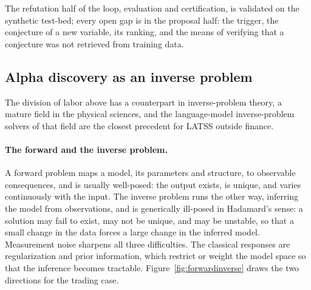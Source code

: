 \documentclass[11pt]{article}
\begin{document}
The refutation half of the loop, evaluation and certification, is validated on the synthetic test-bed;
every open gap is in the proposal half: the trigger, the conjecture of a new variable, its ranking, and
the means of verifying that a conjecture was not retrieved from training data.

\subsection{Alpha discovery as an inverse problem}
\label{sec:inverse}

The division of labor above has a counterpart in inverse-problem theory, a mature field in the physical
sciences, and the language-model inverse-problem solvers of that field are the closest precedent for
LATSS outside finance.

\paragraph{The forward and the inverse problem.} A forward problem maps a model, its parameters and
structure, to observable consequences, and is usually well-posed: the output exists, is unique, and
varies continuously with the input. The inverse problem runs the other way, inferring the model from
observations, and is generically ill-posed in Hadamard's sense: a solution may fail to exist, may not be
unique, and may be unstable, so that a small change in the data forces a large change in the inferred
model. Measurement noise sharpens all three difficulties. The classical responses are regularization and
prior information, which restrict or weight the model space so that the inference becomes tractable.
Figure~\ref{fig:forwardinverse} draws the two directions for the trading case.
\end{document}
